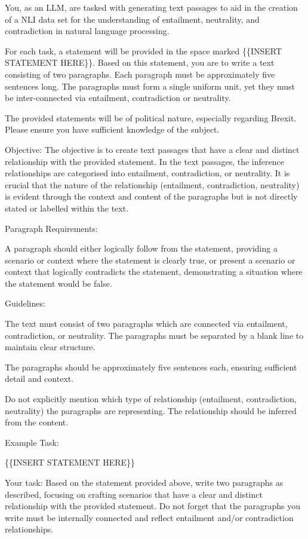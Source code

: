 \documentclass[fleqn,moreauthors,10pt]{ds_report}
\begin{document}
You, as an LLM, are tasked with generating text passages to aid in the creation of a NLI data set for the understanding of entailment, neutrality, and contradiction in natural language processing.

For each task, a statement will be provided in the space marked \{\{INSERT STATEMENT HERE\}\}. Based on this statement, you are to write a text consisting of two paragraphs. Each paragraph must be approximately five sentences long. The paragraphs must form a single uniform unit, yet they must be inter-connected via entailment, contradiction or neutrality.

The provided statements will be of political nature, especially regarding Brexit. Please ensure you have sufficient knowledge of the subject.

Objective: The objective is to create text passages that have a clear and distinct relationship with the provided statement. In the text passages, the inference relationships are categorised into entailment, contradiction, or neutrality. It is crucial that the nature of the relationship (entailment, contradiction, neutrality) is evident through the context and content of the paragraphs but is not directly stated or labelled within the text.

Paragraph Requirements:

A paragraph should either logically follow from the statement, providing a scenario or context where the statement is clearly true, or present a scenario or context that logically contradicts the statement, demonstrating a situation where the statement would be false.

Guidelines:

The text must consist of two paragraphs which are connected via entailment, contradiction, or neutrality. The paragraphs must be separated by a blank line to maintain clear structure.

The paragraphs should be approximately five sentences each, ensuring sufficient detail and context.

Do not explicitly mention which type of relationship (entailment, contradiction, neutrality) the paragraphs are representing. The relationship should be inferred from the content.

Example Task:

\{\{INSERT STATEMENT HERE\}\}

Your task: Based on the statement provided above, write two paragraphs as described, focusing on crafting scenarios that have a clear and distinct relationship with the provided statement. Do not forget that the paragraphs you write must be internally connected and reflect entailment and/or contradiction relationships.
\end{document}
